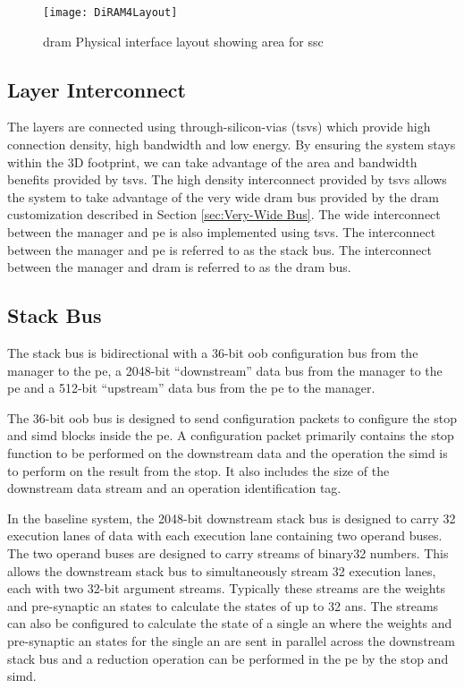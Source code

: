 \begin{figure}[!t]
\centering
\captionsetup{justification=centering}
\captionsetup{width=.9\linewidth}
\centerline{
\mbox{\texttt{[image: DiRAM4Layout]}}
}
\caption{\ac{dram} Physical interface layout showing area for \ac{ssc}}
\label{fig:diram4Layout}
\end{figure}


\subsection{Layer Interconnect}
\label{sec:Layer Interconnect}

The layers are connected using through-silicon-vias (\ac{tsv}s) which provide high connection density, high bandwidth and low energy.
By ensuring the system stays within the 3D footprint, we can take advantage of the area and bandwidth benefits provided by \acp{tsv}.
The high density interconnect provided by \acp{tsv} allows the system to take advantage of the very wide \ac{dram} bus provided by the \ac{dram} customization described in Section \ref{sec:Very-Wide Bus}.
The wide interconnect between the manager and \ac{pe} is also implemented using \acp{tsv}.
The interconnect between the manager and \ac{pe} is referred to as the stack bus. The interconnect between the manager and \ac{dram} is referred to as the \ac{dram} bus.

\subsection{Stack Bus}
\label{sec:Stack Bus}

The stack bus is bidirectional with a 36-bit \ac{oob} configuration bus from the manager to the \ac{pe}, a 2048-bit ``downstream'' data bus from the manager to the \ac{pe} and a 512-bit ``upstream'' data bus from the \ac{pe} to the manager.

The 36-bit \ac{oob} bus is designed to send configuration packets to configure the \ac{stop} and \ac{simd} blocks inside the \ac{pe}.
A configuration packet primarily contains the \ac{stop} function to be performed on the downstream data and the operation the \ac{simd} is to perform on the result from the \ac{stop}.
It also includes the size of the downstream data stream and an operation identification tag.

In the baseline system, the 2048-bit downstream stack bus is designed to carry 32 execution lanes of data with each execution lane containing two operand buses. 
The two operand buses are designed to carry streams of \ac{binary32} numbers.
This allows the downstream stack bus to simultaneously stream 32 execution lanes, each with two 32-bit argument streams. 
Typically these streams are the weights and pre-synaptic \ac{an} states to calculate the states of up to 32 \acp{an}. 
The streams can also be configured to calculate the state of a single \ac{an} where the weights and pre-synaptic \ac{an} states for the single \ac{an} are sent in parallel across the downstream stack bus and a reduction operation can be performed in the \ac{pe} by the \ac{stop} and \ac{simd}.

